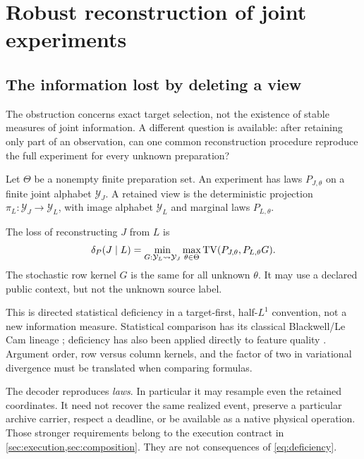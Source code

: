 

\section{Robust reconstruction of joint experiments}\label{sec:reconstruction}
\subsection{The information lost by deleting a view}
The obstruction concerns exact target selection, not the existence of stable measures of joint information. A different question is available: after retaining only part of an observation, can one common reconstruction procedure reproduce the full experiment for every unknown preparation?

Let \(\Theta\) be a nonempty finite preparation set. An experiment has laws \(P_{J,\theta}\) on a finite joint alphabet \(\mathcal Y_J\). A retained view is the deterministic projection \(\pi_L:\mathcal Y_J\to\mathcal Y_L\), with image alphabet \(\mathcal Y_L\) and marginal laws \(P_{L,\theta}\).
\begin{definition}\label{def:deficiency}
The loss of reconstructing \(J\) from \(L\) is
\begin{equation}\label{eq:deficiency}
 \delta_P(J\mid L)=\min_{G:\mathcal Y_L\rightsquigarrow\mathcal Y_J}
 \max_{\theta\in\Theta}\operatorname{TV}(P_{J,\theta},P_{L,\theta}G).
\end{equation}
The stochastic row kernel \(G\) is the same for all unknown \(\theta\). It may use a declared public context, but not the unknown source label.
\end{definition}
This is directed statistical deficiency in a target-first, half-\(L^1\) convention, not a new information measure. Statistical comparison has its classical Blackwell/Le Cam lineage \cite{Blackwell1953,LeCam1964}; deficiency has also been applied directly to feature quality \cite{vanRooyenWilliamson2014}. Argument order, row versus column kernels, and the factor of two in variational divergence must be translated when comparing formulas.

The decoder reproduces \emph{laws}. In particular it may resample even the retained coordinates. It need not recover the same realized event, preserve a particular archive carrier, respect a deadline, or be available as a native physical operation. Those stronger requirements belong to the execution contract in \cref{sec:execution,sec:composition}. They are not consequences of \cref{eq:deficiency}.

